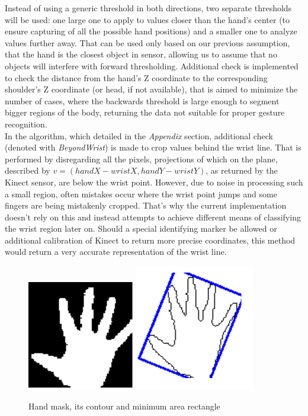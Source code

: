 \documentclass[a4paper,11pt,oneside]{article}
\begin{document}
Instead of using a generic threshold in both directions, two separate thresholds will be used: one large one to apply to values closer than the hand's center (to ensure capturing of all the possible hand positions) and a smaller one to analyze values further away. That can be used only based on our previous assumption, that the hand is the closest object in sensor, allowing us to assume that no objects will interfere with forward thresholding. Additional check is implemented to check the distance from the hand's Z coordinate to the corresponding shoulder's Z coordinate (or head, if not available), that is aimed to minimize the number of cases, where the backwards threshold is large enough to segment bigger regions of the body, returning the data not suitable for proper gesture recognition.\\

In the algorithm, which detailed in the \textit{Appendix} section, additional check (denoted with \textit{BeyondWrist}) is made to crop values behind the wrist line. That is performed by disregarding all the pixels, projections of which on the plane, described by $v = (handX - wristX, handY - wristY)$, as returned by the Kinect sensor, are below the wrist point. However, due to noise in processing such a small region, often mistakes occur where the wrist point jumps and some fingers are being mistakenly cropped. That's why the current implementation doesn't rely on this and instead attempts to achieve different means of classifying the wrist region later on. Should a special identifying marker be allowed or additional calibration of Kinect  to return more precise coordinates, this method would return a very accurate representation of the wrist line.\\

  \begin{figure}[H]
  \centering
  \includegraphics[scale=1.5]{hand-mask.png}
\includegraphics[scale=1.5]{hand-box.png}
\caption{Hand mask, its contour and minimum area rectangle}
\end{figure}
\end{document}
